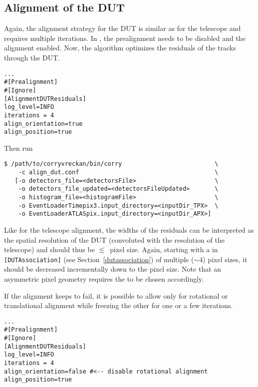 \subsection*{Alignment of the DUT}
Again, the alignment strategy for the DUT is similar as for the telescope and requires multiple iterations.
In , the prealignment needs to be disabled and the alignment enabled.
Now, the algorithm optimizes the residuals of the tracks through the DUT.

\begin{verbatim}
...
#[Prealignment]
#[Ignore]
[AlignmentDUTResiduals]
log_level=INFO
iterations = 4
align_orientation=true
align_position=true
\end{verbatim}

Then run
\begin{verbatim}
$ /path/to/corryvreckan/bin/corry                          \
    -c align_dut.conf                                      \
   [-o detectors_file=<detectorsFile>                      \
    -o detectors_file_updated=<detectorsFileUpdated>       \
    -o histogram_file=<histogramFile>                      \
    -o EventLoaderTimepix3.input_directory=<inputDir_TPX>  \
    -o EventLoaderATLASpix.input_directory=<inputDir_APX>]
\end{verbatim}

Like for the telescope alignment, the widths of the residuals can be interpreted as the spatial resolution of the DUT (convoluted with the resolution of the telescope) and should thus be $\lesssim$~pixel size.
Again, starting with a  in \texttt{[DUTAssociation]} (see Section~\ref{dutassociation}) of multiple ($\sim4$) pixel sizes, it should be decreased incrementally down to the pixel size. Note that an asymmetric pixel geometry requires the \parameter{spatial_cut} to be chosen accordingly.

If the alignment keeps to fail, it is possible to allow only for rotational or translational alignment while freezing the other for one or a few iterations.

\begin{verbatim}
...
#[Prealignment]
#[Ignore]
[AlignmentDUTResiduals]
log_level=INFO
iterations = 4
align_orientation=false #<-- disable rotational alignment
align_position=true
\end{verbatim}
